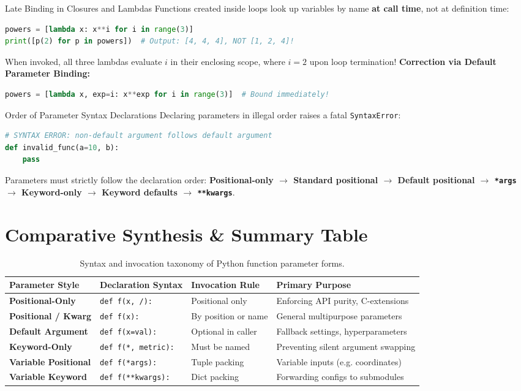 \begin{trapbox}{Late Binding in Closures and Lambdas}
Functions created inside loops look up variables by name \textbf{at call time}, not at definition time:
\begin{lstlisting}[language=Python]
powers = [lambda x: x**i for i in range(3)]
print([p(2) for p in powers])  # Output: [4, 4, 4], NOT [1, 2, 4]!
\end{lstlisting}
When invoked, all three lambdas evaluate $i$ in their enclosing scope, where $i = 2$ upon loop termination!
\textbf{Correction via Default Parameter Binding:}
\begin{lstlisting}[language=Python]
powers = [lambda x, exp=i: x**exp for i in range(3)]  # Bound immediately!
\end{lstlisting}
\end{trapbox}

\begin{trapbox}{Order of Parameter Syntax Declarations}
Declaring parameters in illegal order raises a fatal \texttt{SyntaxError}:
\begin{lstlisting}[language=Python]
# SYNTAX ERROR: non-default argument follows default argument
def invalid_func(a=10, b): 
    pass
\end{lstlisting}
Parameters must strictly follow the declaration order:
\textbf{Positional-only $\to$ Standard positional $\to$ Default positional $\to$ \texttt{*args} $\to$ Keyword-only $\to$ Keyword defaults $\to$ \texttt{**kwargs}}.
\end{trapbox}

\section{Comparative Synthesis \& Summary Table}

\begin{table}[htbp]
\centering
\small
\begin{tabular}{p{2.8cm} p{2.8cm} p{2.6cm} p{3.8cm}}
\hline
\textbf{Parameter Style} & \textbf{Declaration Syntax} & \textbf{Invocation Rule} & \textbf{Primary Purpose} \\
\hline
\textbf{Positional-Only} & \texttt{def f(x, /):} & Positional only & Enforcing API purity, C-extensions \\
\textbf{Positional / Kwarg} & \texttt{def f(x):} & By position or name & General multipurpose parameters \\
\textbf{Default Argument} & \texttt{def f(x=val):} & Optional in caller & Fallback settings, hyperparameters \\
\textbf{Keyword-Only} & \texttt{def f(*, metric):} & Must be named & Preventing silent argument swapping \\
\textbf{Variable Positional} & \texttt{def f(*args):} & Tuple packing & Variable inputs (e.g. coordinates) \\
\textbf{Variable Keyword} & \texttt{def f(**kwargs):} & Dict packing & Forwarding configs to submodules \\
\hline
\end{tabular}
\caption{Syntax and invocation taxonomy of Python function parameter forms.}
\label{tab:parameter_taxonomy}
\end{table}


